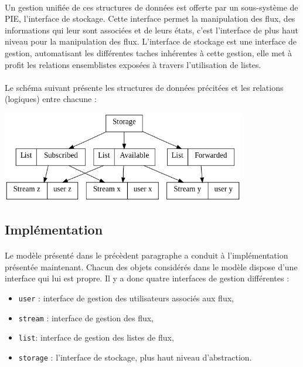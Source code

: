 \paragraph{}

Un gestion unifiée de ces structures de données est offerte par un sous-système de PIE,
l'interface de stockage. Cette interface permet la manipulation des flux, des informations 
qui leur sont associées et de leurs états, c'est l'interface de plus haut niveau pour la
manipulation des flux. L'interface de stockage est une interface de gestion, automatisant
les différentes taches inhérentes à cette gestion, elle met à profit les relations ensemblistes 
exposées à travers l'utilisation de listes.


\paragraph{}

Le schéma suivant présente les structures de données précitées et les relations (logiques)
entre chacune :

\begin{center}
    \includegraphics[width=0.8\textwidth]{img/struct.png}
\end{center}


\subsection{Implémentation}

\paragraph{}

Le modèle présenté dans le précèdent paragraphe a conduit à l'implémentation
présentée maintenant. Chacun des objets considérés dans le modèle dispose d'une
interface qui lui est propre. Il y a donc quatre interfaces de gestion différentes :

\begin{itemize}
	\item \texttt{user} : interface de gestion des utilisateurs associés aux flux,
	\item \texttt{stream} : interface de gestion des flux,
	\item \texttt{list}:  interface de gestion des listes de flux,
	\item \texttt{storage} : l'interface de stockage, plus haut niveau d'abstraction.
\end{itemize}


